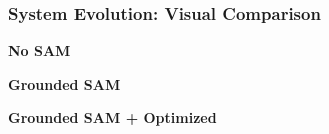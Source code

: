 \documentclass[serif, aspectratio=169, 9pt]{beamer}
\begin{document}
\begin{frame}
\frametitle{System Evolution: Visual Comparison}
    \centering

    \small
    \begin{minipage}{0.3\textwidth}
        \centering
        \textbf{No SAM}
    \end{minipage}
    \hfill
    \begin{minipage}{0.3\textwidth}
        \centering
        \textbf{Grounded SAM}
    \end{minipage}
    \hfill
    \begin{minipage}{0.3\textwidth}
        \centering
        \textbf{Grounded SAM + Optimized}
    \end{minipage}

    \vspace{0.4em}


\end{frame}
\end{document}

